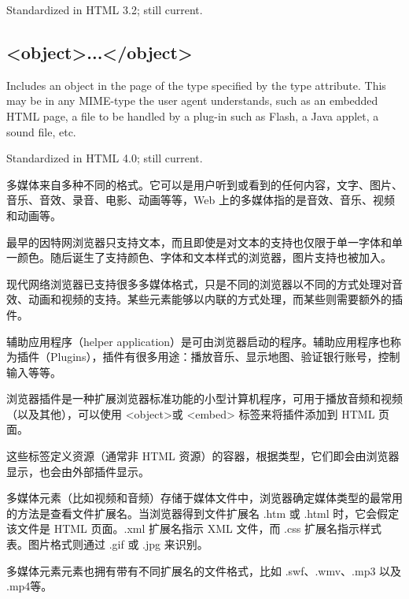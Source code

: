 Standardized in HTML 3.2; still current.




\subsection{<object>...</object>}


Includes an object in the page of the type specified by the type attribute. This may be in any MIME-type the user agent understands, such as an embedded HTML page, a file to be handled by a plug-in such as Flash, a Java applet, a sound file, etc.



Standardized in HTML 4.0; still current.

多媒体来自多种不同的格式。它可以是用户听到或看到的任何内容，文字、图片、音乐、音效、录音、电影、动画等等，Web 上的多媒体指的是音效、音乐、视频和动画等。



最早的因特网浏览器只支持文本，而且即使是对文本的支持也仅限于单一字体和单一颜色。随后诞生了支持颜色、字体和文本样式的浏览器，图片支持也被加入。

现代网络浏览器已支持很多多媒体格式，只是不同的浏览器以不同的方式处理对音效、动画和视频的支持。某些元素能够以内联的方式处理，而某些则需要额外的插件。

辅助应用程序（helper application）是可由浏览器启动的程序。辅助应用程序也称为插件（Plugins），插件有很多用途：播放音乐、显示地图、验证银行账号，控制输入等等。

浏览器插件是一种扩展浏览器标准功能的小型计算机程序，可用于播放音频和视频（以及其他），可以使用 <object>或 <embed> 标签来将插件添加到 HTML 页面。

这些标签定义资源（通常非 HTML 资源）的容器，根据类型，它们即会由浏览器显示，也会由外部插件显示。

多媒体元素（比如视频和音频）存储于媒体文件中，浏览器确定媒体类型的最常用的方法是查看文件扩展名。当浏览器得到文件扩展名 .htm 或 .html 时，它会假定该文件是 HTML 页面。.xml 扩展名指示 XML 文件，而 .css 扩展名指示样式表。图片格式则通过 .gif 或 .jpg 来识别。


多媒体元素元素也拥有带有不同扩展名的文件格式，比如 .swf、.wmv、.mp3 以及 .mp4等。

